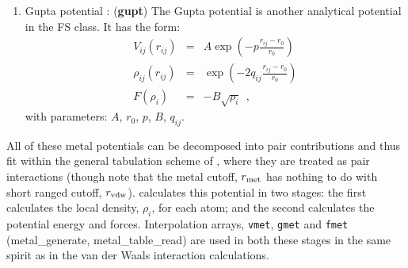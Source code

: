 \begin{enumerate}
({\bf stch})
The Sutton Chen potential is an analytical potential in the FS
class.  It has the form:
\begin{eqnarray}
V_{ij}(r_{ij}) &=& \epsilon \left( \frac{a}{r_{ij}} \right)^{n} \nonumber \\
\rho_{ij}(r_{ij}) &=& \left( \frac{a}{r_{ij}} \right)^{m} \\
F(\rho_{i}) &=& -c \epsilon \sqrt{\rho_{i}}~~, \nonumber
\end{eqnarray}
with parameters: $\epsilon$, $a$, $n$, $m$, $c$.
\item Gupta potential \cite{cleri-93a}:  ({\bf gupt})
The Gupta potential is another analytical potential in the FS
class.  It has the form:
\begin{eqnarray}
V_{ij}(r_{ij}) &=& A \exp \left(-p \frac{r_{ij}-r_{0}}{r_{0}}\right) \nonumber \\
\rho_{ij}(r_{ij}) &=& \exp \left(-2 q_{ij} \frac{r_{ij}-r_{0}}{r_{0}}\right) \\
F(\rho_{i}) &=& -B \sqrt{\rho_{i}}~~, \nonumber
\end{eqnarray}
with parameters: $A$, $r_{0}$, $p$, $B$, $q_{ij}$.
\end{enumerate}

All of these metal potentials can be decomposed into pair
contributions and thus fit within the general tabulation scheme of \D,
where they are treated as pair interactions (though note that the
metal cutoff, $r_{\rm met}$ has nothing to do with short ranged cutoff,
$r_{\rm vdw}$).  \D calculates this potential in two stages: the first
calculates the local density, $\rho_{i}$, for each atom; and the
second calculates the potential energy and forces.  Interpolation
arrays, {\tt vmet}, {\tt gmet} and {\tt fmet} ({\sc metal\_generate},
{\sc metal\_table\_read}) are used in both these stages in the same
spirit as in the van der Waals interaction calculations.

